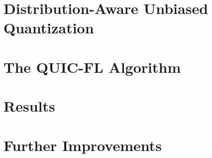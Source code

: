 \documentclass{beamer}
\begin{document}
    \section{Distribution-Aware Unbiased Quantization}
    
    \section{The QUIC-FL Algorithm}
    
    \section{Results}
    
    \section{Further Improvements}
\end{document}
